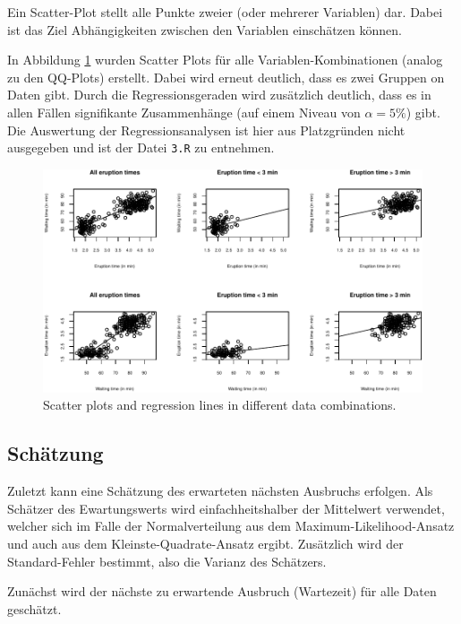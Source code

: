 \documentclass[10pt,]{article}
\newenvironment{Shaded}{\begin{snugshade}}{\end{snugshade}}
\newcommand{\KeywordTok}[1]{\textcolor[rgb]{0.13,0.29,0.53}{\textbf{{#1}}}}
\newcommand{\DecValTok}[1]{\textcolor[rgb]{0.00,0.00,0.81}{{#1}}}
\newcommand{\StringTok}[1]{\textcolor[rgb]{0.31,0.60,0.02}{{#1}}}
\newcommand{\CommentTok}[1]{\textcolor[rgb]{0.56,0.35,0.01}{\textit{{#1}}}}
\newcommand{\NormalTok}[1]{{#1}}
\begin{document}
Ein Scatter-Plot stellt alle Punkte zweier (oder mehrerer Variablen)
dar. Dabei ist das Ziel Abhängigkeiten zwischen den Variablen
einschätzen können.

In Abbildung \ref{fig:scat} wurden Scatter Plots für alle
Variablen-Kombinationen (analog zu den QQ-Plots) erstellt. Dabei wird
erneut deutlich, dass es zwei Gruppen on Daten gibt. Durch die
Regressionsgeraden wird zusätzlich deutlich, dass es in allen Fällen
signifikante Zusammenhänge (auf einem Niveau von \(\alpha = 5\%\)) gibt.
Die Auswertung der Regressionsanalysen ist hier aus Platzgründen nicht
ausgegeben und ist der Datei \texttt{3.R} zu entnehmen.

\begin{figure}[htbp]
\centering
\includegraphics{project1_files/figure-latex/scatter-1.pdf}
\caption{Scatter plots and regression lines in different data
combinations.\label{fig:scat}}
\end{figure}

\subsection{Schätzung}\label{schatzung}

Zuletzt kann eine Schätzung des erwarteten nächsten Ausbruchs erfolgen.
Als Schätzer des Ewartungswerts wird einfachheitshalber der Mittelwert
verwendet, welcher sich im Falle der Normalverteilung aus dem
Maximum-Likelihood-Ansatz und auch aus dem Kleinste-Quadrate-Ansatz
ergibt. Zusätzlich wird der Standard-Fehler bestimmt, also die Varianz
des Schätzers.

Zunächst wird der nächste zu erwartende Ausbruch (Wartezeit) für alle
Daten geschätzt.

\begin{Shaded}
\end{Shaded}
\end{document}
